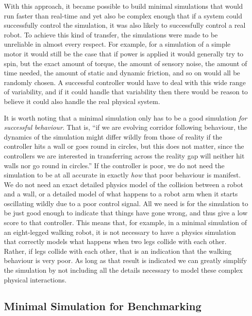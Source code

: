 \documentclass{frontiersSCNS} %
\begin{document}
With this approach, it became possible to build minimal simulations that would
run faster than real-time and yet also be complex enough that if a system
could successfully control the simulation, it was also likely to successfully
control a real robot.  To achieve this kind of transfer, the simulations were made to be
unreliable in almost every respect.  For example, for a simulation of a simple
motor it would still be the case that if power is applied it would generally
try to spin, but the exact amount of torque, the amount of sensory noise,
the amount of time needed, the amount of static and dynamic friction, and so
on would all be randomly chosen.  A successful controller would have to deal
with this wide range of variability, and if it could handle that variability
then there would be reason to believe it could also handle the real physical system.

It is worth noting that a minimal simulation only has to be a
good simulation \emph{for successful behaviour}.  That is, ``if we are evolving 
corridor following behaviour, the dynamics of the simulation might
differ wildly from those of reality if the controller hits a wall or
goes round in circles, but this does
not matter, since the controllers we are interested in transferring
across the reality gap will neither
hit walls nor go round in circles.''  \citep[p.~41]{jakobiThesis}  If the controller is poor, we do not 
need the simulation to be at all accurate in exactly \emph{how} that poor
behaviour is manifest.  We do not need an exact detailed physics model of
the collision between a robot and a wall, or a detailed model of what happens
to a robot arm when it starts oscillating wildly due to a poor control signal.
All we need is for the simulation to be just good enough to indicate that
things have gone wrong, and thus give a low score to that controller.  This
means that, for example, in a minimal simulation of an eight-legged walking robot,
it is not necessary to have a physics simulation that correctly models what
happens when two legs collide with each other.  Rather, if legs collide
with each other, that is an indication that the walking behaviour is very poor.
As long as that result is indicated we can greatly simplify the simulation
by not including all the details necessary to model these complex physical
interactions.

\subsection{Minimal Simulation for Benchmarking}
\end{document}
